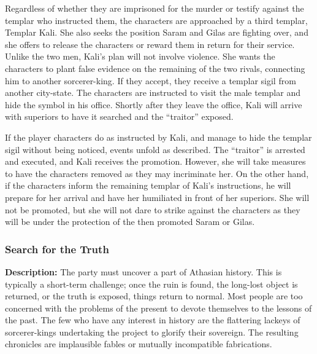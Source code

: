 Regardless of whether they are imprisoned for the murder or testify against the templar who instructed them, the characters are approached by a third templar, Templar Kali. She also seeks the position Saram and Gilas are fighting over, and she offers to release the characters or reward them in return for their service. Unlike the two men, Kali's plan will not involve violence. She wants the characters to plant false evidence on the remaining of the two rivals, connecting him to another sorcerer-king. If they accept, they receive a templar sigil from another city-state. The characters are instructed to visit the male templar and hide the symbol in his office. Shortly after they leave the office, Kali will arrive with superiors to have it searched and the ``traitor'' exposed.

If the player characters do as instructed by Kali, and manage to hide the templar sigil without being noticed, events unfold as described. The ``traitor'' is arrested and executed, and Kali receives the promotion. However, she will take measures to have the characters removed as they may incriminate her. On the other hand, if the characters inform the remaining templar of Kali's instructions, he will prepare for her arrival and have her humiliated in front of her superiors. She will not be promoted, but she will not dare to strike against the characters as they will be under the protection of the then promoted Saram or Gilas.


\subsubsection{Search for the Truth}

\textbf{Description:} The party must uncover a part of Athasian history. This is typically a short-term challenge; once the ruin is found, the long-lost object is returned, or the truth is exposed, things return to normal. Most people are too concerned with the problems of the present to devote themselves to the lessons of the past. The few who have any interest in history are the flattering lackeys of sorcerer-kings undertaking the project to glorify their sovereign. The resulting chronicles are implausible fables or mutually incompatible fabrications.

